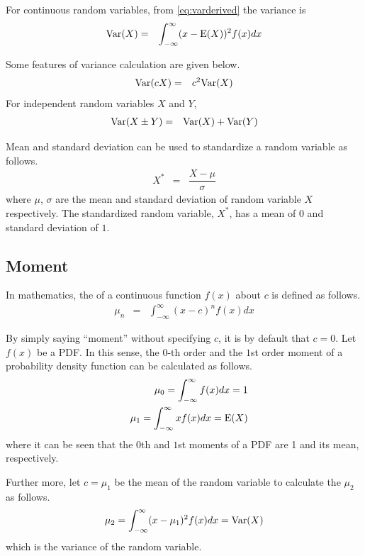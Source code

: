 For continuous random variables, from \eqref{eq:varderived} the variance is
\begin{eqnarray}
	\textup{Var}(X) &=& \int_{-\infty}^{\infty} (x-\textup{E}(X))^2f(x)dx \nonumber
\end{eqnarray}

Some features of variance calculation are given below.
\begin{eqnarray}
	\textup{Var}(cX) &=& c^2\textup{Var}(X) \nonumber
\end{eqnarray}
For independent random variables $X$ and $Y$,
\begin{eqnarray}
	\textup{Var}(X\pm Y) &=& \textup{Var}(X) + \textup{Var}(Y) \nonumber
\end{eqnarray}

Mean and standard deviation can be used to standardize a random variable as follows.
\begin{eqnarray}
	X^* &=& \dfrac{X-\mu}{\sigma} \nonumber
\end{eqnarray}
where $\mu$, $\sigma$ are the mean and standard deviation of random variable $X$ respectively. The standardized random variable, $X^*$, has a mean of $0$ and standard deviation of $1$.

\subsection{Moment} \label{sec:moments}

In mathematics, the  of a continuous function $f(x)$ about $c$ is defined as follows.
\begin{eqnarray}
	\mu_n &=& \int_{-\infty}^{\infty}(x-c)^nf(x)dx \nonumber
\end{eqnarray}

By simply saying ``moment'' without specifying $c$, it is by default that $c=0$. Let $f(x)$ be a PDF. In this sense, the $0$-th order and the $1$st order moment of a probability density function can be calculated as follows.
\begin{eqnarray}
	&& \mu_0 = \int_{-\infty}^{\infty}f(x)dx = 1 \nonumber \\
	&& \mu_1 = \int_{-\infty}^{\infty}xf(x)dx = \textup{E}(X) \nonumber
\end{eqnarray}
where it can be seen that the $0$th and $1$st moments of a PDF are 1 and its mean, respectively.

Further more, let $c=\mu_1$ be the mean of the random variable to calculate the  $\mu_2$ as follows.
\begin{eqnarray}
	\mu_2 = \int_{-\infty}^{\infty}(x-\mu_1)^2f(x)dx = \textup{Var}(X) \nonumber
\end{eqnarray}
which is the variance of the random variable.

